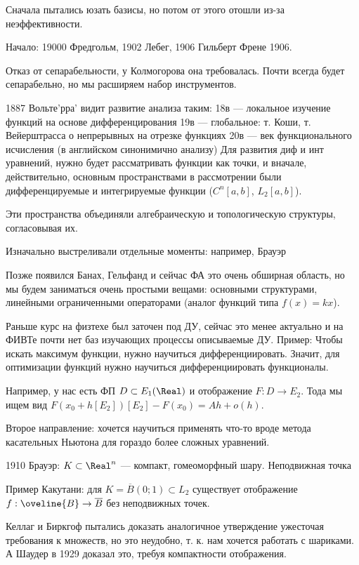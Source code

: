 

Сначала пытались юзать базисы, но потом от этого отошли из-за
неэффективности.

Начало:
19000 Фредгольм, 1902 Лебег, 1906 Гильберт Френе 1906.

Отказ от сепарабельности, у Колмогорова она требовалась.
Почти всегда будет сепарабельно, но мы расширяем набор инструментов.

1887 Вольте’рра’ видит развитие анализа таким:
18в — локальное изучение функций на основе дифференцирования
19в — глобальное: т. Коши, т. Вейерштрасса о непрерывных на отрезке функциях
20в — век функционального исчисления (в английском синонимично анализу)
Для развития диф и инт уравнений, нужно будет рассматривать функции как точки,
и вначале, действительно, основным пространствами в рассмотрении были дифференцируемые
и интегрируемые функции ($C^n[a, b]$, $L_2[a, b]$).

Эти пространства объединяли алгебраическую и топологическую структуры, согласовывая их.

Изначально выстреливали отдельные моменты: например, Брауэр

Позже появился Банах, Гельфанд и сейчас ФА это очень обширная область,
но мы будем заниматься очень простыми вещами: основными структурами,
линейными ограниченными операторами (аналог функций типа $f(x) = kx$).

Раньше курс на физтехе был заточен под ДУ, сейчас это менее актуально
и на ФИВТе почти нет баз изучающих процессы описываемые ДУ.
Пример: Чтобы искать максимум функции, нужно научиться дифференциировать.
Значит, для оптимизации функций нужно научиться дифференциировать функционалы.

Например, у нас есть ФП $D \subset E_1(\Real)$ и отображение $F : D \to E_2$.
Тода мы ищем вид $F(x_0 + h[E_2])[E_2] - F(x_0) = A h + o(h)$.

Второе направление: хочется научиться применять что-то вроде метода касательных Ньютона
для гораздо более сложных уравнений.

1910 Брауэр: $K \subset \Real^n$ — компакт, гомеоморфный шару.
Неподвижная точка

Пример Какутани: для $K = \overline{B}(0; 1) \subset L_2$ существует
отображение $f : \oveline{B} \to \overline{B}$ без неподвижных точек.

Келлаг и Биркгоф пытались доказать аналогичное утверждение
ужесточая требования к множеств, но это неудобно, т. к. нам хочется
работать с шариками.
А Шаудер в 1929 доказал это, требуя компактности отображения.

